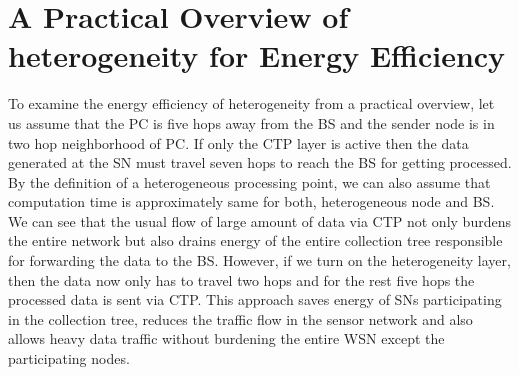 \section{A Practical Overview of heterogeneity for Energy Efficiency}

To examine the energy efficiency of heterogeneity from a practical overview, let us assume that the \ac{PC} is five hops away from the \ac{BS} and the sender node is in two hop neighborhood of \ac{PC}. If  only the \ac{CTP} layer is active then the data generated at the \ac{SN} must travel seven hops to reach the \ac{BS} for getting processed. By the definition of a heterogeneous processing point, we can also assume that computation time is approximately same for both, heterogeneous node and \ac{BS}. We can see that the usual flow of large amount of data via \ac{CTP} not only burdens the entire network but also drains energy of the entire collection tree responsible for forwarding the data to the \ac{BS}. However, if we turn on the heterogeneity layer, then the data now only has to travel two hops and for the rest five hops the processed data is sent via \ac{CTP}. This approach saves energy of \acp{SN} participating in the collection tree, reduces the traffic flow in the sensor network and also allows heavy data traffic without burdening the entire \ac{WSN} except the participating nodes.
    


    
    
    

    
    
    

